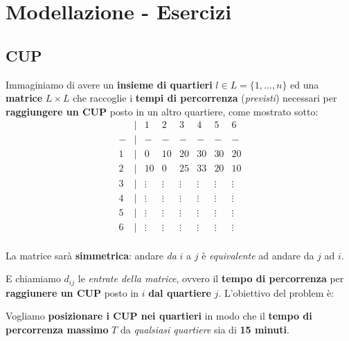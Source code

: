 \chapter{Modellazione - Esercizi}

\section{CUP}

Immaginiamo di avere un \textbf{insieme di quartieri} $l\in L = \{1,\ldots , n\}$ ed 
una \textbf{matrice} $L\times L$ che raccoglie i \textbf{tempi di percorrenza} 
(\textit{previsti}) necessari per \textbf{raggiungere un CUP} 
posto in un altro quartiere, come mostrato sotto:
\[
    \begin{matrix}
        & | & 1 & 2 & 3 & 4 & 5 & 6 \\ 
      - & | & - & - & - & - & - & - \\ 
      1 & | & 0 & 10 & 20 & 30 & 30 & 20 \\ 
      2 & | & 10 & 0 & 25 & 33 & 20 & 10 \\ 
      3 & | & \vdots & \vdots & \vdots & \vdots & \vdots & \vdots \\ 
      4 & | & \vdots & \vdots & \vdots & \vdots & \vdots & \vdots \\ 
      5 & | & \vdots & \vdots & \vdots & \vdots & \vdots & \vdots \\ 
      6 & | & \vdots & \vdots & \vdots & \vdots & \vdots & \vdots \\ 
    \end{matrix}
\]

\begin{remark}
    La matrice sarà \textbf{simmetrica}: andare \textit{da} $i$ a $j$ è
    \textit{equivalente} ad andare da $j$ ad $i$.
\end{remark}

E chiamiamo $d_{ij}$ le \textit{entrate della matrice}, ovvero il \textbf{tempo di percorrenza}
per \textbf{raggiunere un CUP} posto in $i$ \textbf{dal quartiere} $j$.
L'obiettivo del problem è:

\begin{exa}[PROBLEMA]
    Vogliamo \textbf{posizionare i CUP nei quartieri} in modo che
    il \textbf{tempo di percorrenza massimo} $T$ da \textit{qualsiasi quartiere}
    sia di \textbf{15 minuti}.
\end{exa}

